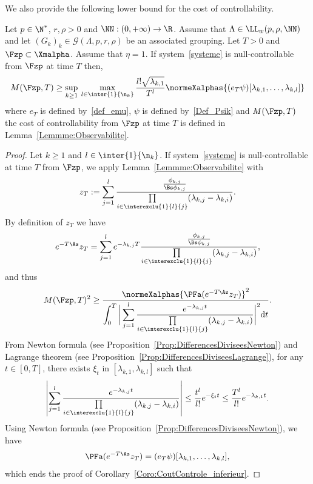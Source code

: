 We also provide the following lower bound for the cost of controllability.
\begin{coro} \label{Coro:CoutControle_inferieur}
Let $p \in \N^*$, $r, \rho > 0$ and $\NN : (0,+\infty) \to \R$. Assume that $\Lambda \in \LL_w(p,\rho, \NN)$ and let $(G_k)_k\in \mathcal{G}(\Lambda,p,r,\rho)$ be an associated grouping. Let $T>0$ and $\Fzp \subset \Xmalpha$. Assume that $\eta=1$. If system~\eqref{systeme} is null-controllable from $\Fzp$ at time $T$ then,
\[
M(\Fzp,T) \geq \sup\limits_{k \geq 1} \: \max\limits_{l \in \inter{1}{\n_k}}
\frac{l! \sqrt{\lambda_{k,1}}}{T^l} \normeXalphas{ (e_T \psi) [\lambda_{k,1}, \dots, \lambda_{k,l}] }
\]
where $e_T$ is defined by~\eqref{def_emu}, $\psi$ is defined by~\eqref{Def_Psik} and $M(\Fzp,T)$ the cost of controllability from $\Fzp$ at time $T$ is defined in Lemma~\ref{Lemmme:Observabilite}.
\end{coro}


\begin{proof}
Let $k\geq1$ and $l \in \inter{1}{\n_k}$. If system~\eqref{systeme} is null-controllable at time $T$ from $\Fzp$, we apply Lemma~\ref{Lemmme:Observabilite} with
\[
z_T:=\sum_{j=1}^{l} \frac{ \frac{\phi_{k,j}}{\Bs \phi_{k,j}} }{\prod\limits_{i\in \interexclu{1}{l}{j}} (\lambda_{k,j}-\lambda_{k,i})}.
\]
By definition of $z_T$ we have
\[
e^{-T \As} z_T = \sum_{j=1}^{l} e^{-\lambda_{k,j} T} \frac{ \frac{\phi_{k,j}}{\Bs \phi_{k,j}} }{\prod\limits_{i\in \interexclu{1}{l}{j}} (\lambda_{k,j}-\lambda_{k,i})},
\]
and thus
\begin{equation*}
M(\Fzp, T)^2 \geq \dfrac{\normeXalphas{ \PFa (e^{-T\As} z_T) }^2}{\displaystyle\int_0^T \bigg| \sum_{j=1}^{l} \frac{e^{-\lambda_{k,j} t}}{\prod\limits_{i\in \interexclu{1}{l}{j}} (\lambda_{k,j}-\lambda_{k,i})} \bigg|^2 \mathrm{d}t}.
\end{equation*}
From Newton formula (see Proposition~\ref{Prop:DifferencesDiviseesNewton}) and Lagrange theorem (see Proposition~\ref{Prop:DifferencesDiviseesLagrange}), for any $t \in [0,T]$, there exists $\xi_{t}$ in $[\lambda_{k,1}, \lambda_{k,l}]$ such that
\[
\left| \sum_{j=1}^{l} \frac{e^{-\lambda_{k,j} t}}{\prod\limits_{i\in \interexclu{1}{l}{j}} (\lambda_{k,j}-\lambda_{k,i})} \right|
\leq \frac{t^{l}}{l!} e^{-\xi_{t} t} \leq \frac{T^{l}}{l!} e^{-\lambda_{k,1} t}.
\]
Using Newton formula (see Proposition~\ref{Prop:DifferencesDiviseesNewton}), we have
\[
\PFa (e^{-T\As} z_T) = (e_T \psi) [\lambda_{k,1}, \dots, \lambda_{k,l}],
\]
which ends the proof of Corollary~\ref{Coro:CoutControle_inferieur}.
\end{proof}



